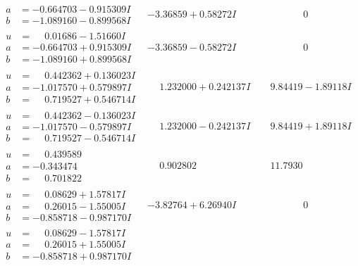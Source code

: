 \documentclass[1p]{elsarticle_modified}
\theoremstyle{definition}
\begin{document}
$$\begin{array}{c|c|c}
\begin{aligned}
a &= -0.664703 - 0.915309 I \\
b &= -1.089160 - 0.899568 I\end{aligned}
 & -3.36859 + 0.58272 I & \phantom{-0.000000 } 0 \\ \hline\begin{aligned}
u &= \phantom{-}0.01686 - 1.51660 I \\
a &= -0.664703 + 0.915309 I \\
b &= -1.089160 + 0.899568 I\end{aligned}
 & -3.36859 - 0.58272 I & \phantom{-0.000000 } 0 \\ \hline\begin{aligned}
u &= \phantom{-}0.442362 + 0.136023 I \\
a &= -1.017570 + 0.579897 I \\
b &= \phantom{-}0.719527 + 0.546714 I\end{aligned}
 & \phantom{-}1.232000 + 0.242137 I & \phantom{-}9.84419 - 1.89118 I \\ \hline\begin{aligned}
u &= \phantom{-}0.442362 - 0.136023 I \\
a &= -1.017570 - 0.579897 I \\
b &= \phantom{-}0.719527 - 0.546714 I\end{aligned}
 & \phantom{-}1.232000 - 0.242137 I & \phantom{-}9.84419 + 1.89118 I \\ \hline\begin{aligned}
u &= \phantom{-}0.439589\phantom{ +0.000000I} \\
a &= -0.343474\phantom{ +0.000000I} \\
b &= \phantom{-}0.701822\phantom{ +0.000000I}\end{aligned}
 & \phantom{-}0.902802\phantom{ +0.000000I} & \phantom{-}11.7930\phantom{ +0.000000I} \\ \hline\begin{aligned}
u &= \phantom{-}0.08629 + 1.57817 I \\
a &= \phantom{-}0.26015 - 1.55005 I \\
b &= -0.858718 - 0.987170 I\end{aligned}
 & -3.82764 + 6.26940 I & \phantom{-0.000000 } 0 \\ \hline\begin{aligned}
u &= \phantom{-}0.08629 - 1.57817 I \\
a &= \phantom{-}0.26015 + 1.55005 I \\
b &= -0.858718 + 0.987170 I\end{aligned}

\end{array}$$
\end{document}
